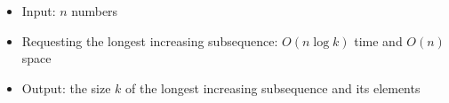 \begin{itemize}
	\item Input: $n$ numbers
	\item Requesting the longest increasing subsequence: $O(n\log{k})$ time and $O(n)$ space
	\item Output: the size $k$ of the longest increasing subsequence and its elements
\end{itemize}